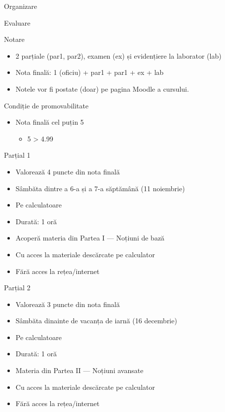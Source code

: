 \documentclass[xcolor=pdftex,romanian,colorlinks]{beamer}
\begin{document}
\begin{section}{Organizare}
\begin{frame}{Evaluare}
\begin{block}{Notare}
\begin{itemize}
\item 2 parțiale (par1, par2), examen (ex) și evidențiere la laborator (lab)
\item Nota finală: 1 (oficiu) + par1 + par1 + ex + lab
\item Notele vor fi postate (doar) pe pagina Moodle a cursului.
\end{itemize}
\end{block}

\begin{block}{Condiție de promovabilitate}
\begin{itemize}
\item Nota finală \alert{cel puțin 5}
\begin{itemize}
  \item 5 > 4.99
\end{itemize}
\end{itemize}
\end{block}

\end{frame}

\begin{frame}{Parțial 1}
\begin{itemize}
\item Valorează 4 puncte din nota finală
\item Sâmbăta dintre a 6-a și a 7-a săptămână (11 noiembrie)
\item Pe calculatoare
\item Durată: 1 oră
\item Acoperă materia din Partea I --- Noțiuni de bază
\item Cu acces la materiale descărcate pe calculator
\item Fără acces la rețea/internet
\end{itemize}
\end{frame}

\begin{frame}{Parțial 2}
\begin{itemize}
\item Valorează 3 puncte din nota finală
\item Sâmbăta dinainte de vacanța de iarnă  (16 decembrie)
\item Pe calculatoare
\item Durată: 1 oră
\item Materia din Partea II --- Noțiuni avansate
\item Cu acces la materiale descărcate pe calculator
\item Fără acces la rețea/internet
\end{itemize}
\end{frame}


\end{section}
\end{document}
